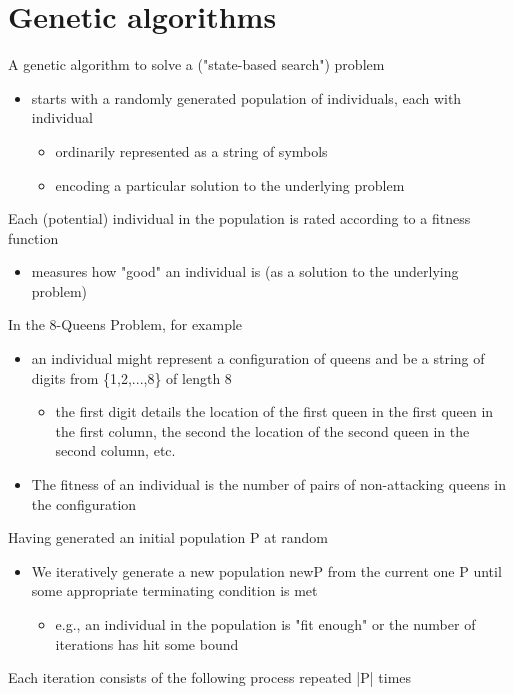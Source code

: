\documentclass{article}[18pt]
\begin{document}
\section{Genetic algorithms}
A genetic algorithm to solve a ("state-based search") problem
\begin{itemize}
	\item starts with a randomly generated population of individuals, each with individual
	\begin{itemize}
		\item ordinarily represented as a string of symbols
		\item encoding a particular solution to the underlying problem
	\end{itemize}
\end{itemize}
Each (potential) individual in the population is rated according to a fitness function
\begin{itemize}
	\item measures how "good" an individual is (as a solution to the underlying problem)
\end{itemize}
In the 8-Queens Problem, for example
\begin{itemize}
	\item an individual might represent a configuration of queens and be a string of digits from \{1,2,...,8\} of length 8
	\begin{itemize}
		\item the first digit details the location of the first queen in the first queen in the first column, the second the location of the second queen in the second column, etc.
	\end{itemize}
	\item The fitness of an individual is the number of pairs of non-attacking queens in the configuration
\end{itemize}
Having generated an initial population P at random
\begin{itemize}
	\item We iteratively generate a new population newP from the current one P until some appropriate terminating condition is met
	\begin{itemize}
		\item e.g., an individual in the population is "fit enough" or the number of iterations has hit some bound
	\end{itemize}
\end{itemize}
Each iteration consists of the following process repeated |P| times
\end{document}
